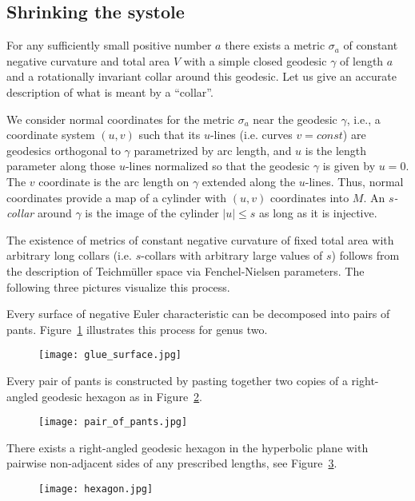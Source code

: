 \documentclass[12pt]{article}
\numberwithin{equation}{section}
\theoremstyle{definition}
\begin{document}
\subsection{Shrinking the systole}
For any sufficiently small positive number $a$ there exists a metric $\sigma_a$ of constant negative curvature and total area $V$ with a simple closed geodesic $\gamma$ of length $a$ and a rotationally invariant collar around this geodesic. Let us give an accurate description of what is meant by a ``collar''.

We  consider normal coordinates for the metric $\sigma_a$ near the geodesic $\gamma$, i.e., a coordinate system $(u,v)$ such that its $u$-lines (i.e. curves $v=const$) are geodesics orthogonal to $\gamma$ parametrized by arc length, and $u$ is the  length parameter along those $u$-lines normalized so that  the  geodesic $\gamma$ is given by $u=0$. The $v$ coordinate is the arc length on $\gamma$ extended along the $u$-lines. Thus, normal coordinates provide a  map of a cylinder  with $(u,v)$ coordinates into $M$. An {\em $s$-collar } around $\gamma$ is the image of the cylinder $|u|\le s$ as long as it is injective. 

The existence of metrics of constant negative curvature of fixed total area  with arbitrary long collars (i.e. $s$-collars with arbitrary large  values of $s$) follows from the description of Teichm\"uller space via Fenchel-Nielsen parameters. The following three pictures visualize this process.

Every surface of negative Euler characteristic can be decomposed into pairs of pants. Figure~\ref{glueing} illustrates this process for genus two.   
\begin{figure}[H]
      \centering
      \texttt{[image: glue\_surface.jpg]}
      \caption{}
      \label{glueing}
      \end{figure}Every pair of pants is constructed by pasting together two copies of a right-angled geodesic hexagon as in Figure~\ref{pants}.
  \begin{figure}[H]
      \centering
      \texttt{[image: pair\_of\_pants.jpg]}
      \caption{}
      \label{pants}
      \end{figure}
There exists a right-angled geodesic hexagon in the hyperbolic plane with pairwise non-adjacent sides of any prescribed lengths, see Figure~\ref{hexagon}.
  \begin{figure}[H]
      \centering
      \texttt{[image: hexagon.jpg]}
      \caption{}
      \label{hexagon}
      \end{figure}
\end{document}
